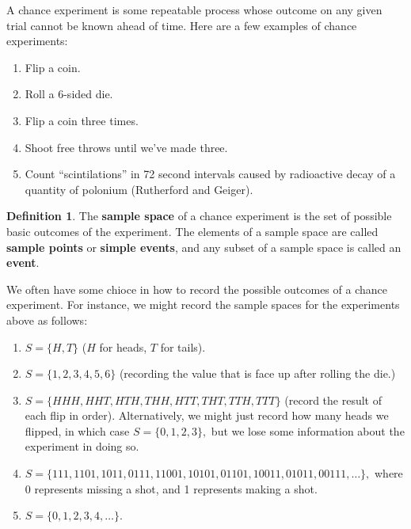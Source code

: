 \documentclass[
]{book}
\providecommand{\tightlist}{%
  \setlength{\itemsep}{0pt}\setlength{\parskip}{0pt}}
\theoremstyle{definition}
\newtheorem{definition}{Definition}[chapter]
\theoremstyle{definition}
\theoremstyle{definition}
\theoremstyle{definition}
\theoremstyle{remark}
\begin{document}
A chance experiment is some repeatable process whose outcome on any given trial cannot be known ahead of time. Here are a few examples of chance experiments:

\begin{enumerate}
\def\labelenumi{\arabic{enumi}.}
\tightlist
\item
  Flip a coin.
\item
  Roll a 6-sided die.
\item
  Flip a coin three times.
\item
  Shoot free throws until we've made three.
\item
  Count ``scintilations'' in 72 second intervals caused by radioactive decay of a quantity of polonium (Rutherford and Geiger).
\end{enumerate}

\begin{definition}
\protect\hypertarget{def:sample-space}{}\label{def:sample-space}The \textbf{sample space} of a chance experiment is the set of possible basic outcomes of the experiment. The elements of a sample space are called \textbf{sample points} or \textbf{simple events}, and any subset of a sample space is called an \textbf{event}.
\end{definition}

We often have some chioce in how to record the possible outcomes of a chance experiment. For instance, we might record the sample spaces for the experiments above as follows:

\begin{enumerate}
\def\labelenumi{\arabic{enumi}.}
\tightlist
\item
  \(S = \{ H, T \}\) (\(H\) for heads, \(T\) for tails).
\item
  \(S = \{1,2,3,4,5,6\}\) (recording the value that is face up after rolling the die.)
\item
  \(S = \{HHH,HHT,HTH,THH,HTT,THT,TTH,TTT\}\) (record the result of each flip in order). Alternatively, we might just record how many heads we flipped, in which case \(S = \{0,1,2,3\},\) but we lose some information about the experiment in doing so.
\item
  \(S = \{111, 1101, 1011, 0111, 11001, 10101, 01101, 10011, 01011, 00111, \ldots \},\) where 0 represents missing a shot, and 1 represents making a shot.
\item
  \(S = \{0, 1, 2, 3, 4, \ldots \}\).
\end{enumerate}
\end{document}
